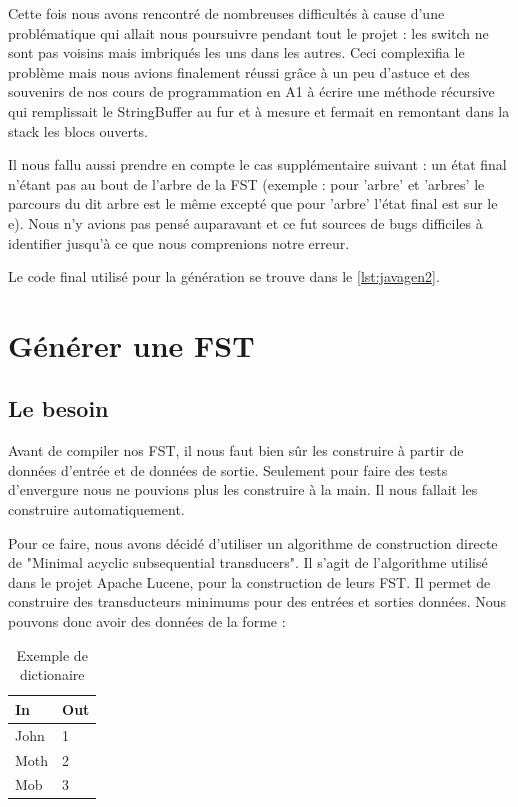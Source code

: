 Cette fois nous avons rencontré de nombreuses difficultés à cause d'une problématique
qui allait nous poursuivre pendant tout le projet : les switch ne sont pas voisins mais
imbriqués les uns dans les autres.
Ceci complexifia le problème mais nous avions finalement réussi grâce à un peu d'astuce
et des souvenirs de nos cours de programmation en A1 à écrire une méthode récursive
qui remplissait le StringBuffer au fur et à mesure et fermait en remontant dans la
stack les blocs ouverts.

Il nous fallu aussi prendre en compte le cas supplémentaire suivant : un état final n'étant
pas au bout de l'arbre de la FST (exemple : pour 'arbre' et 'arbres' le parcours du dit
arbre est le même excepté que pour 'arbre' l'état final est sur le e). Nous n'y avions pas
pensé auparavant et ce fut sources de bugs difficiles à identifier jusqu'à ce que
nous comprenions notre erreur.\newline


Le code final utilisé pour la génération se trouve dans le \autoref{lst:javagen2}.

\newpage
\section{Générer une FST}

\subsection{Le besoin}

Avant de compiler nos FST, il nous faut bien sûr les construire à partir de données
d'entrée et de données de sortie. Seulement pour faire des tests d'envergure nous
ne pouvions plus les construire à la main. Il nous fallait les construire automatiquement.

Pour ce faire, nous avons décidé d'utiliser un algorithme de construction directe de "Minimal acyclic subsequential transducers". Il s'agit de l'algorithme utilisé dans le projet Apache Lucene, pour la construction de leurs FST. Il permet de construire des transducteurs minimums pour des entrées et sorties données. Nous pouvons donc avoir des données de la forme :

\begin{table}[h]
    \centering
    \begin{tabular}{|l|l|}
        \hline
        In & Out \\
        \hline
        John & 1 \\
        Moth & 2 \\
        Mob & 3 \\
        \hline
    \end{tabular}
    \caption{Exemple de dictionaire}
    \label{tab:exemple1}
\end{table}

